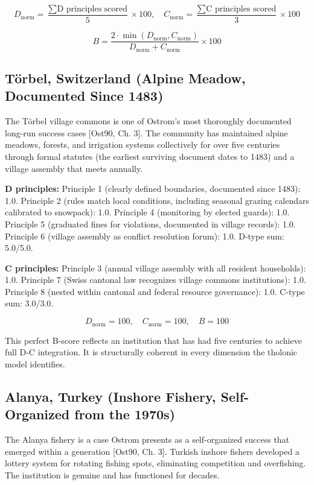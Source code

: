 \documentclass[12pt]{article}
\begin{document}
\[D_{\text{norm}} = \frac{\sum \text{D principles scored}}{5} \times 100, \quad C_{\text{norm}} = \frac{\sum \text{C principles scored}}{3} \times 100\]

\[B = \frac{2 \cdot \min(D_{\text{norm}}, C_{\text{norm}})}{D_{\text{norm}} + C_{\text{norm}}} \times 100\]

\subsection{Törbel, Switzerland (Alpine Meadow, Documented Since 1483)}\label{tuxf6rbel-switzerland-alpine-meadow-documented-since-1483}

The Törbel village commons is one of Ostrom's most thoroughly documented
long-run success cases {[}Ost90, Ch. 3{]}. The community has maintained
alpine meadows, forests, and irrigation systems collectively for over
five centuries through formal statutes (the earliest surviving document
dates to 1483) and a village assembly that meets annually.

\textbf{D principles:} Principle 1 (clearly defined boundaries,
documented since 1483): 1.0. Principle 2 (rules match local conditions,
including seasonal grazing calendars calibrated to snowpack): 1.0.
Principle 4 (monitoring by elected guards): 1.0. Principle 5 (graduated
fines for violations, documented in village records): 1.0. Principle 6
(village assembly as conflict resolution forum): 1.0. D-type sum:
5.0/5.0.

\textbf{C principles:} Principle 3 (annual village assembly with all
resident households): 1.0. Principle 7 (Swiss cantonal law recognizes
village commons institutions): 1.0. Principle 8 (nested within cantonal
and federal resource governance): 1.0. C-type sum: 3.0/3.0.

\[D_{\text{norm}} = 100, \quad C_{\text{norm}} = 100, \quad B = 100\]

This perfect B-score reflects an institution that has had five centuries
to achieve full D-C integration. It is structurally coherent in every
dimension the tholonic model identifies.

\subsection{Alanya, Turkey (Inshore Fishery, Self-Organized from the 1970s)}\label{alanya-turkey-inshore-fishery-self-organized-from-the-1970s}

The Alanya fishery is a case Ostrom presents as a self-organized success
that emerged within a generation {[}Ost90, Ch. 3{]}. Turkish inshore
fishers developed a lottery system for rotating fishing spots,
eliminating competition and overfishing. The institution is genuine and
has functioned for decades.
\end{document}
